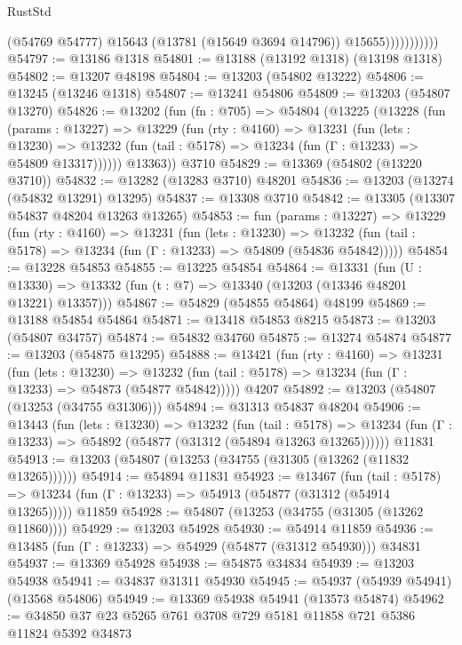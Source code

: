 \begin{lexlean}{RustStd}
\begin{coremodule}
                          (@54769 @54777)
                          @15643
                          (@13781 (@15649 @3694 @14796))
                          @15655)))))))))))
@54797 := @13186 @1318
@54801 := @13188 (@13192 @1318) (@13198 @1318)
@54802 := @13207 @48198
@54804 := @13203 (@54802 @13222)
@54806 := @13245 (@13246 @1318)
@54807 := @13241 @54806
@54809 := @13203 (@54807 @13270)
@54826 := @13202
    (fun (fn : @705) =>
    @54804
      (@13225
        (@13228
          (fun (params : @13227) =>
          @13229
            (fun (rty : @4160) =>
            @13231
              (fun (lets : @13230) =>
              @13232 (fun (tail : @5178) => @13234 (fun (Γ : @13233) => @54809 @13317))))))
        @13363))
    @3710
@54829 := @13369 (@54802 (@13220 @3710))
@54832 := @13282 (@13283 @3710) @48201
@54836 := @13203 (@13274 (@54832 @13291) @13295)
@54837 := @13308 @3710
@54842 := @13305 (@13307 @54837 @48204 @13263 @13265)
@54853 := fun (params : @13227) =>
  @13229
    (fun (rty : @4160) =>
    @13231
      (fun (lets : @13230) =>
      @13232 (fun (tail : @5178) => @13234 (fun (Γ : @13233) => @54809 (@54836 @54842)))))
@54854 := @13228 @54853
@54855 := @13225 @54854
@54864 := @13331
    (fun (U : @13330) => @13332 (fun (t : @7) => @13340 (@13203 (@13346 @48201 @13221) @13357)))
@54867 := @54829 (@54855 @54864) @48199
@54869 := @13188 @54854 @54864
@54871 := @13418 @54853 @8215
@54873 := @13203 (@54807 @34757)
@54874 := @54832 @34760
@54875 := @13274 @54874
@54877 := @13203 (@54875 @13295)
@54888 := @13421
    (fun (rty : @4160) =>
    @13231
      (fun (lets : @13230) =>
      @13232 (fun (tail : @5178) => @13234 (fun (Γ : @13233) => @54873 (@54877 @54842)))))
    @4207
@54892 := @13203 (@54807 (@13253 (@34755 @31306)))
@54894 := @31313 @54837 @48204
@54906 := @13443
    (fun (lets : @13230) =>
    @13232
      (fun (tail : @5178) =>
      @13234 (fun (Γ : @13233) => @54892 (@54877 (@31312 (@54894 @13263 @13265))))))
    @11831
@54913 := @13203 (@54807 (@13253 (@34755 (@31305 (@13262 (@11832 @13265))))))
@54914 := @54894 @11831
@54923 := @13467
    (fun (tail : @5178) => @13234 (fun (Γ : @13233) => @54913 (@54877 (@31312 (@54914 @13265)))))
    @11859
@54928 := @54807 (@13253 (@34755 (@31305 (@13262 @11860))))
@54929 := @13203 @54928
@54930 := @54914 @11859
@54936 := @13485 (fun (Γ : @13233) => @54929 (@54877 (@31312 @54930))) @34831
@54937 := @13369 @54928
@54938 := @54875 @34834
@54939 := @13203 @54938
@54941 := @34837 @31311 @54930
@54945 := @54937 (@54939 @54941) (@13568 @54806)
@54949 := @13369 @54938 @54941 (@13573 @54874)
@54962 := @34850 @37 @23 @5265 @761 @3708 @729 @5181 @11858 @721 @5386 @11824 @5392 @34873

\end{coremodule}
\end{lexlean}

